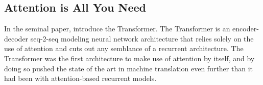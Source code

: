 
\subsection{Attention is All You Need}

In the seminal paper, \citet{vaswani2017attention} introduce the Transformer. The Transformer is an encoder-decoder seq-2-seq modeling neural network architecture that relies solely on the use of attention and cuts out any semblance of a recurrent architecture. The Transformer was the first architecture to make use of attention by itself, and by doing so pushed the state of the art in machine translation even further than it had been with attention-based recurrent models. 

